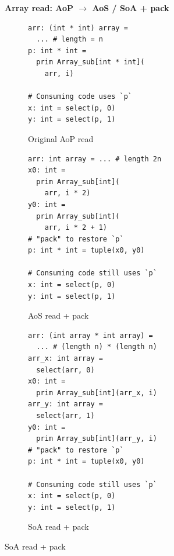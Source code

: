 \begin{figure}[htbp]
  \centering
  {\centering\textbf{\footnotesize Array read: AoP $\to$ AoS / SoA + pack}\par}\vspace{1mm}
  \begin{subfigure}[t]{0.32\textwidth}
    \caption{Original AoP read}
    \label{fig:pack_read_aop}
    \label{fig:pack_read_example}
    \vspace{1mm}
\begin{verbatim}
arr: (int * int) array =
  ... # length = n
p: int * int =
  prim Array_sub[int * int](
    arr, i)

# Consuming code uses `p`
x: int = select(p, 0)
y: int = select(p, 1)
\end{verbatim}
  \end{subfigure}\hfill
  \begin{subfigure}[t]{0.32\textwidth}
    \caption{AoS read + pack}
    \label{fig:pack_read_aos}
    \vspace{1mm}
\begin{verbatim}
arr: int array = ... # length 2n
x0: int =
  prim Array_sub[int](
    arr, i * 2)
y0: int =
  prim Array_sub[int](
    arr, i * 2 + 1)
# "pack" to restore `p`
p: int * int = tuple(x0, y0)

# Consuming code still uses `p`
x: int = select(p, 0)
y: int = select(p, 1)
\end{verbatim}
  \end{subfigure}\hfill
  \begin{subfigure}[t]{0.32\textwidth}
    \caption{SoA read + pack}
    \label{fig:pack_read_soa}
    \vspace{1mm}
\begin{verbatim}
arr: (int array * int array) =
  ... # (length n) * (length n)
arr_x: int array =
  select(arr, 0)
x0: int =
  prim Array_sub[int](arr_x, i)
arr_y: int array =
  select(arr, 1)
y0: int =
  prim Array_sub[int](arr_y, i)
# "pack" to restore `p`
p: int * int = tuple(x0, y0)

# Consuming code still uses `p`
x: int = select(p, 0)
y: int = select(p, 1)
\end{verbatim}
  \end{subfigure}


\end{figure}
